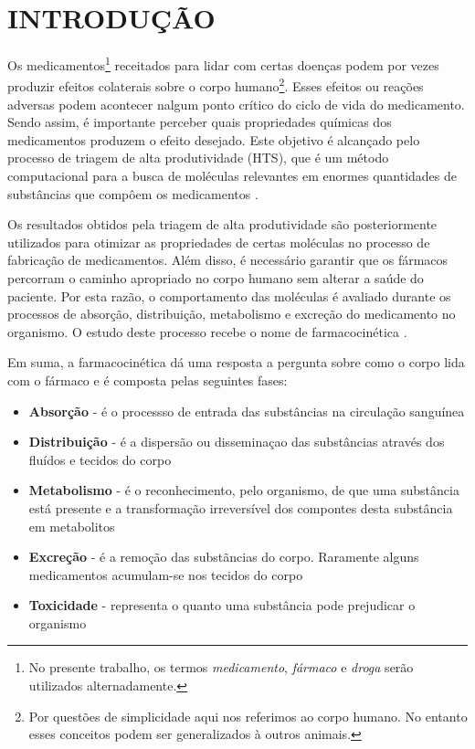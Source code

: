\section{INTRODUÇÃO}
\label{sec:3introducao}

Os medicamentos\footnote{No presente trabalho, os termos \emph{medicamento}, \emph{fármaco} e \emph{droga} serão utilizados alternadamente.} 
receitados para lidar com certas doenças podem por vezes produzir efeitos colaterais sobre o corpo humano\footnote{Por questões 
de simplicidade aqui nos referimos ao corpo humano. No entanto esses conceitos podem ser generalizados à outros animais.}. 
Esses efeitos ou reações adversas podem acontecer nalgum ponto crítico do ciclo de vida do medicamento. Sendo assim, é importante
perceber quais propriedades químicas dos medicamentos produzem o efeito desejado. Este objetivo é alcançado pelo processo de triagem de 
alta produtividade (\ac{HTS}), que é um método computacional para a busca de moléculas relevantes
em enormes quantidades de substâncias que compôem os medicamentos \citep{TDI2013}.

Os resultados obtidos pela triagem de alta produtividade são posteriormente utilizados para otimizar as propriedades de certas moléculas
no processo de fabricação de medicamentos. Além disso, é necessário garantir que os fármacos percorram o caminho apropriado no corpo humano
sem alterar a saúde do paciente. Por esta razão, o comportamento das moléculas é avaliado durante os processos de absorção, distribuição, 
metabolismo e excreção do medicamento no organismo. O estudo deste processo recebe o nome de farmacocinética \citep{DiPiro2010}. 

Em suma, a farmacocinética dá uma resposta a pergunta sobre como o corpo lida com o fármaco e é composta pelas seguintes fases:
\begin{itemize}
  \item {\textbf{Absorção} - é o processso de entrada das substâncias na circulação sanguínea}
  \item {\textbf{Distribuição} - é a dispersão ou disseminaçao das substâncias através dos fluídos e tecidos do corpo}
  \item {\textbf{Metabolismo} - é o reconhecimento, pelo organismo, de que uma substância está presente e a transformação irreversível dos compontes desta
  substância em metabolitos}
  \item {\textbf{Excreção} - é a remoção das substãncias do corpo. Raramente alguns medicamentos acumulam-se nos tecidos do corpo}
  \item {\textbf{Toxicidade} - representa o quanto uma substância pode prejudicar o organismo}
\end{itemize}

